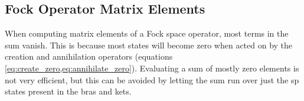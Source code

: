 \documentclass[../main/report.tex]{subfiles}
\begin{document}
\subsection{Fock Operator Matrix Elements}

When computing matrix elements of a Fock space operator, most terms in the sum vanish. 
This is because most states will become zero when acted on by the creation and annihilation operators (equations \cref{eq:create_zero,eq:annihilate_zero}).
Evaluating a sum of mostly zero elements is not very efficient, but this can be 
avoided by letting the sum run over just the sp states present in the bras and kets.

\end{document}
